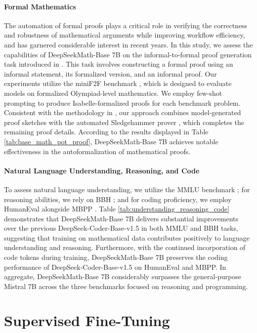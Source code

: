 \begin{itemize}[topsep=0pt]
\paragraph{Formal Mathematics}

The automation of formal proofs plays a critical role in verifying the correctness and robustness of mathematical arguments while improving workflow efficiency, and has garnered considerable interest in recent years. In this study, we assess the capabilities of DeepSeekMath-Base 7B on the informal-to-formal proof generation task introduced in \citep{dsp_proof}. This task involves constructing a formal proof using an informal statement, its formalized version, and an informal proof. Our experiments utilize the miniF2F benchmark \citep{minif2f}, which is designed to evaluate models on formalized Olympiad-level mathematics. We employ few-shot prompting to produce Isabelle-formalized proofs for each benchmark problem. Consistent with the methodology in \cite{dsp_proof}, our approach combines model-generated proof sketches with the automated Sledgehammer prover \citep{sledgehammer}, which completes the remaining proof details. According to the results displayed in Table \ref{tab:base_math_pot_proof}, DeepSeekMath-Base 7B achieves notable effectiveness in the autoformalization of mathematical proofs.

\paragraph{Natural Language Understanding, Reasoning, and Code}

To assess natural language understanding, we utilize the MMLU benchmark \citep{mmlu}; for reasoning abilities, we rely on BBH \citep{bbh}; and for coding proficiency, we employ HumanEval \citep{codex} alongside MBPP \citep{mbpp}. Table \ref{tab:understanding_reasoning_code} demonstrates that DeepSeekMath-Base 7B delivers substantial improvements over the previous DeepSeek-Coder-Base-v1.5 \citep{deepseek-coder} in both MMLU and BBH tasks, suggesting that training on mathematical data contributes positively to language understanding and reasoning. Furthermore, with the continued incorporation of code tokens during training, DeepSeekMath-Base 7B preserves the coding performance of DeepSeek-Coder-Base-v1.5 on HumanEval and MBPP. In aggregate, DeepSeekMath-Base 7B considerably surpasses the general-purpose Mistral 7B \citep{mistral} across the three benchmarks focused on reasoning and programming.

\section{Supervised Fine-Tuning}


\end{itemize}
